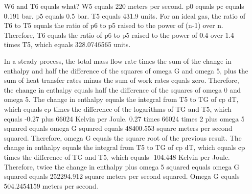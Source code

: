 W6 and T6 equals what? W5 equals 220 meters per second. p0 equals pc equals 0.191 bar. p5 equals 0.5 bar. T5 equals 431.9 units. For an ideal gas, the ratio of T6 to T5 equals the ratio of p6 to p5 raised to the power of (n-1) over n. Therefore, T6 equals the ratio of p6 to p5 raised to the power of 0.4 over 1.4 times T5, which equals 328.0746565 units.

In a steady process, the total mass flow rate times the sum of the change in enthalpy and half the difference of the squares of omega G and omega 5, plus the sum of heat transfer rates minus the sum of work rates equals zero. Therefore, the change in enthalpy equals half the difference of the squares of omega 0 and omega 5. The change in enthalpy equals the integral from T5 to TG of cp dT, which equals cp times the difference of the logarithms of TG and T5, which equals -0.27 plus 66024 Kelvin per Joule. 0.27 times 66024 times 2 plus omega 5 squared equals omega G squared equals 48400.553 square meters per second squared. Therefore, omega G equals the square root of the previous result. The change in enthalpy equals the integral from T5 to TG of cp dT, which equals cp times the difference of TG and T5, which equals -104.448 Kelvin per Joule. Therefore, twice the change in enthalpy plus omega 5 squared equals omega G squared equals 252294.912 square meters per second squared. Omega G equals 504.2454159 meters per second.